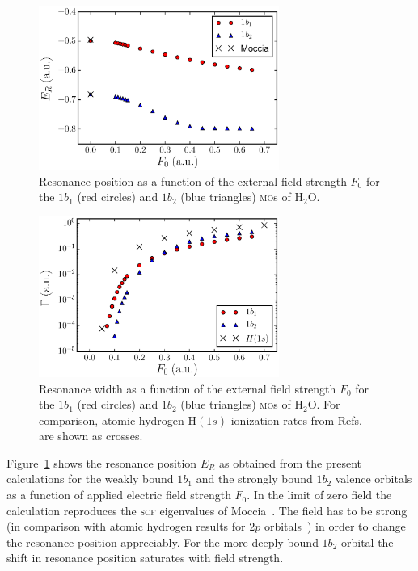 
\begin{figure}
  \centering
  \includegraphics[width=0.7\textwidth]{figures/ch_H2O/1b1_1b2/resPositionvsF1b11b2.eps}
  \caption{Resonance position as a function of the external field
    strength $F_{0}$ for the $1b_{1}$ (red circles) and $1b_{2}$ (blue
    triangles) \textsc{mo}s of H$_{2}$O.}
  \label{fig:1b11b2_position}
\end{figure}

\begin{figure}
  \centering
  \includegraphics[width=0.7\textwidth]{figures/ch_H2O/1b1_1b2/resWidthvsF1b11b2H1s.eps}
  \caption{Resonance width as a function of the external field
    strength $F_{0}$ for the $1b_{1}$ (red circles) and $1b_{2}$ (blue
    triangles) \textsc{mo}s of H$_{2}$O. For comparison, atomic
    hydrogen H$(1s)$ ionization rates from
    Refs.~\cite{Telnov_1989,Kolosov_1987} are shown as crosses.}
  \label{fig:1b11b2_width}
\end{figure}

Figure~\ref{fig:1b11b2_position} shows the resonance position $E_{R}$
as obtained from the present calculations for the weakly bound
$1b_{1}$ and the strongly bound $1b_{2}$ valence orbitals as a
function of applied electric field strength $F_{0}$. In the limit of
zero field the calculation reproduces the \textsc{scf} eigenvalues of
Moccia~\cite{Moccia_1964}. The field has to be strong (in comparison
with atomic hydrogen results for $2p$ orbitals~\cite{Telnov_1989}) in
order to change the resonance position appreciably. For the more
deeply bound $1b_{2}$ orbital the shift in resonance position
saturates with field strength.

